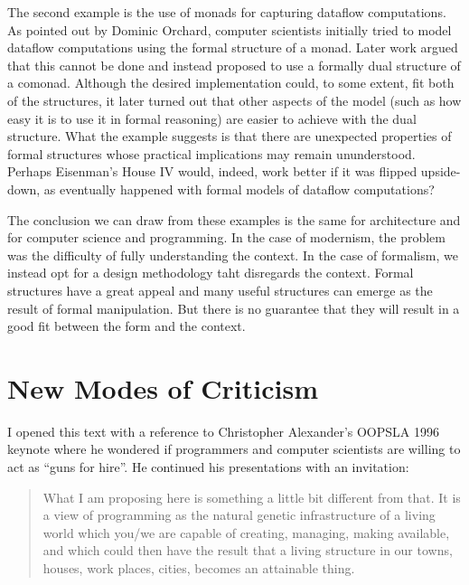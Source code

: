 The second example is the use of monads for capturing dataflow computations. As pointed out
by Dominic Orchard, computer scientists initially tried to model dataflow
computations using the formal structure of a monad. Later work argued that this cannot be done
and instead proposed to use a formally dual structure of a comonad. Although the desired
implementation could, to some extent, fit both of the structures, it later turned out that
other aspects of the model (such as how easy it is to use it in formal reasoning) are
easier to achieve with the dual structure. What the example suggests is that there are
unexpected properties of formal structures whose practical implications may remain
ununderstood. Perhaps Eisenman's House IV would, indeed, work better if it was flipped upside-down,
as eventually happened with formal models of dataflow computations?

The conclusion we can draw from these examples is the same for architecture and
for computer science and programming. In the case of modernism, the problem was the difficulty
of fully understanding the context. In the case of formalism, we instead opt for a design
methodology taht disregards the context. Formal structures have a great appeal and
many useful structures can emerge as the result of formal manipulation. But there is no
guarantee that they will result in a good fit between the form and the context.


\section{New Modes of Criticism}

I opened this text with a reference to Christopher Alexander's OOPSLA 1996 keynote where he
wondered if programmers and computer scientists are willing to act as ``guns for hire''.
He continued his presentations with an invitation:

\begin{quote}
What I am proposing here is something a little bit different from that. It is a view of
programming as the natural genetic infrastructure of a living world which you/we are
capable of creating, managing, making available, and which could then have the result that a
living structure in our towns, houses, work places, cities, becomes an attainable thing.
\end{quote}

